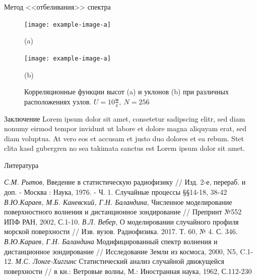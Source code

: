\begin{frame}[t]{}
\begin{columns}[t]
\begin{column}{.48\linewidth}
\begin{block}{Метод <<отбеливания>> спектра}
                \begin{figure}[h]
                    \centering
                    \begin{minipage}{0.49\linewidth}
                            \centering
                            \texttt{[image: example-image-a]}

                            (a)
                    \end{minipage}
                    \begin{minipage}{0.49\linewidth}
                            \centering
                            \texttt{[image: example-image-a]}

                            (b)
                    \end{minipage}
                    \caption{Корреляционные функции высот (a) и уклонов (b) при различных расположениях узлов. $U=10\frac{\text{м}}{\text{с}},~ N = 256$ }
                    \label{fig:}
                \end{figure}
        \end{block}
        \begin{block}{Заключение}
            Lorem ipsum dolor sit amet, consetetur sadipscing elitr, sed diam nonumy eirmod
            tempor invidunt ut labore et dolore magna aliquyam erat, sed diam voluptua. At
            vero eos et accusam et justo duo dolores et ea rebum. Stet clita kasd gubergren
            no sea takimata sanctus est Lorem ipsum dolor sit amet.
        \end{block}
        \begin{block}{Литература}
            \footnotesize
            \begin{thebibliography}{}
                 \textit{С.М. Рытов}, Введение в статистическую радиофизику // Изд. 2-е, перераб. и доп. - Москва : Наука, 1976. - Ч. 1. Случайные процессы \S\S 14-18, 38-42 
                 \textit{В.Ю.Караев, М.Б. Каневский, Г.Н. Баландина}, Численное моделирование поверхностного волнения и дистанционное зондирование // Препринт №552 ИПФ РАН, 2002, С.1-10.
                 \textit{В.Л. Вебер}, О моделировании случайного профиля морской поверхности // Изв. вузов. Радиофизика. 2017. Т. 60, № 4. С. 346.
                 \textit{В.Ю.Караев, Г.Н. Баландина} Модифицированный спектр волнения и дистанционное зондирование // Исследование Земли из космоса, 2000, N5, C.1-12.
                 \textit{М.С. Лонге-Хиггинс} Статистический анализ случайной движущейся поверхности // в кн.: Ветровые волны, М.: Иностранная наука, 1962, С.112-230
            \end{thebibliography}
        \end{block}
      \end{column}
    \end{columns}
  \end{frame}

